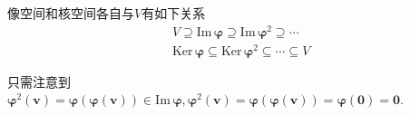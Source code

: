\begin{green}
\begin{lemma}[幂的像空间与核空间]\label{lemma:幂的像空间与核空间}
    像空间和核空间各自与$V$有如下关系
    \begin{align*}
        &V\supseteq \mathrm{Im}\,\bm{\varphi}\supseteq \mathrm{Im}\,\bm{\varphi}^2\supseteq \cdots\\
        &\mathrm{Ker}\,\bm{\varphi}\subseteq \mathrm{Ker}\,\bm{\varphi}^2\subseteq \cdots\subseteq V
    \end{align*}
\end{lemma}
\begin{Proof}
只需注意到$\bm{\varphi}^2\left(\bm{v}\right)=\bm{\varphi}\left(\bm{\varphi}\left(\bm{v}\right)\right)\in \mathrm{Im}\,\bm{\varphi},
\bm{\varphi}^2\left(\bm{v}\right)=\bm{\varphi}\left(\bm{\varphi}\left(\bm{v}\right)\right)=\bm{\varphi}\left(\bm{0}\right)=\bm{0}.$
\end{Proof}
\end{green}
